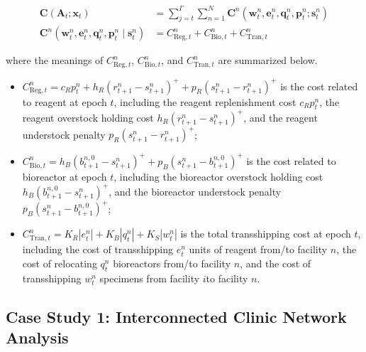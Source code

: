 \documentclass[preprint,review,12pt,nonatbib]{elsarticle}
\begin{document}
\begin{align*}
\mathbf{C}\left(\mathbf{A}_{t} ; \mathbf{x}_{t}\right)&=\sum_{j=t}^{\Gamma} \sum_{n=1}^{N} \mathbf{C}^{n}\left(\mathbf{w}_{t}^{n}, \mathbf{e}_{t}^{n}, \mathbf{q}_{t}^{n}, \mathbf{p}_{t}^{n} ; \mathbf{s}_{t}^{n}\right) \\
\mathbf{C}^{n}\left(\mathbf{w}_{t}^{n}, \mathbf{e}_{t}^{n}, \mathbf{q}_{t}^{n}, \mathbf{p}_{t}^{n} \mid \mathbf{s}_{t}^{n}\right)&=C_{\text{Reg}, t}^{n}+C_{\text{Bio}, t}^{n}+C_{\text{Tran}, t}^{n}
\end{align*}

where the meanings of $C_{\text{Reg}, t}^{n}$, $C_{\text{Bio}, t}^{n}$, and $C_{\text{Tran}, t}^{n}$ are summarized below.

\begin{itemize}
  \item $C_{\text{Reg}, t}^{n} = c_{R} p_{t}^{n} + h_{R}\left(r_{t+1}^{n}-s_{t+1}^{n}\right)^{+} + p_{R}\left(s_{t+1}^{n}-r_{t+1}^{n}\right)^{+}$ is the cost related to reagent at epoch $t$, including the reagent replenishment cost $c_{R} p_{t}^{n}$, the reagent overstock holding cost $h_{R}\left(r_{t+1}^{n}-s_{t+1}^{n}\right)^{+}$, and the reagent understock penalty $p_{R}\left(s_{t+1}^{n}-r_{t+1}^{n}\right)^{+}$;
  \item $C_{\text{Bio}, t}^{n} = h_{B}\left(b_{t+1}^{n, 0}-s_{t+1}^{n}\right)^{+} + p_{B}\left(s_{t+1}^{n}-b_{t+1}^{n, 0}\right)^{+}$ is the cost related to bioreactor at epoch $t$, including the bioreactor overstock holding cost $h_{B}\left(b_{t+1}^{n, 0}-s_{t+1}^{n}\right)^{+}$, and the bioreactor understock penalty $p_{B}\left(s_{t+1}^{n}-b_{t+1}^{n, 0}\right)^{+}$;
  \item $C_{\text{Tran}, t}^{n} = K_{R}\left|e_{t}^{n}\right| + K_{B}\left|q_{t}^{n}\right| + K_{S}\left|w_{t}^{n}\right|$ is the total transshipping cost at epoch $t$, including the cost of transshipping $e_{t}^{n}$ units of reagent from/to facility $n$, the cost of relocating $q_{t}^{n}$ bioreactors from/to facility $n$, and the cost of transshipping $w_{t}^{n}$ specimens from facility $i$to facility $n$.
\end{itemize}


\subsection{Case Study 1: Interconnected Clinic Network Analysis}
\label{subsec:casestudy1}
\end{document}
